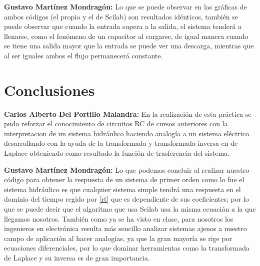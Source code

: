 \documentclass{article}
\begin{document}
\textbf{Gustavo Martínez Mondragón:} Lo que se puede observar en las gráficas de ambos códigos (el propio y el de Scilab) son resultados idénticos, también se puede observar que cuando la entrada supera a la salida, el sistema tenderá a llenarse, como el fenómeno de un capacitor al cargarse, de igual manera cuando se tiene una salida mayor que la entrada se puede ver una descarga, mientras que al ser iguales ambos el flujo permanecerá constante.

\section{Conclusiones}
\textbf{Carlos Alberto Del Portillo Malandra:} En la realización de esta práctica se pudo reforzar el conocimiento de circuitos RC de cursos anteriores con la interpretacion de un sistema hidráulico haciendo analogía a un sistema eléctrico desarrollando con la ayuda de la transformada y transformada inversa en de Laplace obteniendo como resultado la función de trasferencia del sistema. 

\textbf{Gustavo Martínez Mondragón:} Lo que podemos concluir al realizar nuestro código para obtener la respuesta de un sistema de primer orden como lo fue el sistema hidráulico es que cualquier sistema simple tendrá una respuesta en el dominio del tiempo regido por \eqref{rt} que es dependiente de sus coeficientes; por lo que se puede decir que el algoritmo que usa Scilab usa la misma ecuación a la que llegamos nosotros. También como ya se ha visto en clase, para nosotros los ingenieros en electrónica resulta más sencillo analizar sistemas ajenos a nuestro campo de aplicación al hacer analogías, ya que la gran mayoría se rige por ecuaciones diferenciales, por lo que dominar herramientas como la transformada de Laplace y su inversa es de gran importancia.

	
	
\end{document}
